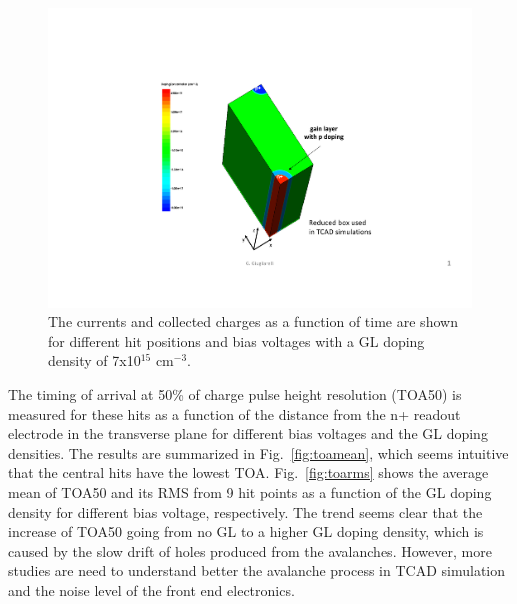 \documentclass[aps,pt14,superscriptaddress,showpacs,floatfix,nofootinbib]{revtex4}
\begin{document}
\begin{figure}[hbtp]
\begin{center}
\includegraphics[page=10,width=0.5\textheight,keepaspectratio]{figures/IBL-3DwithGainLayer_20190610_toWeiming.pdf}
\caption{The currents and collected charges as a function of time are shown for different
hit positions and bias voltages with a GL doping density of 7x10$^{15}$ cm$^{-3}$.\label{fig:drift5}}
\end{center}
\end{figure}
 
The timing of arrival at 50\% of charge pulse height resolution (TOA50) is measured for these hits 
as a function of the distance from the n+ readout electrode in the transverse plane for different bias voltages and the GL 
doping densities.  The results are summarized in Fig.~\ref{fig:toamean}, which seems intuitive that the 
central hits have the lowest TOA.
Fig.~\ref{fig:toarms} shows the average mean of TOA50 and its RMS from 9 hit points as a function of the GL 
doping density for different bias voltage, respectively. The trend seems clear that the increase of TOA50 going 
from no GL to a higher GL doping density, which is caused by the slow drift of holes produced from the avalanches.
However, more studies are need to understand better the avalanche  process in TCAD simulation and the noise 
level of the front end electronics.   
\end{document}
